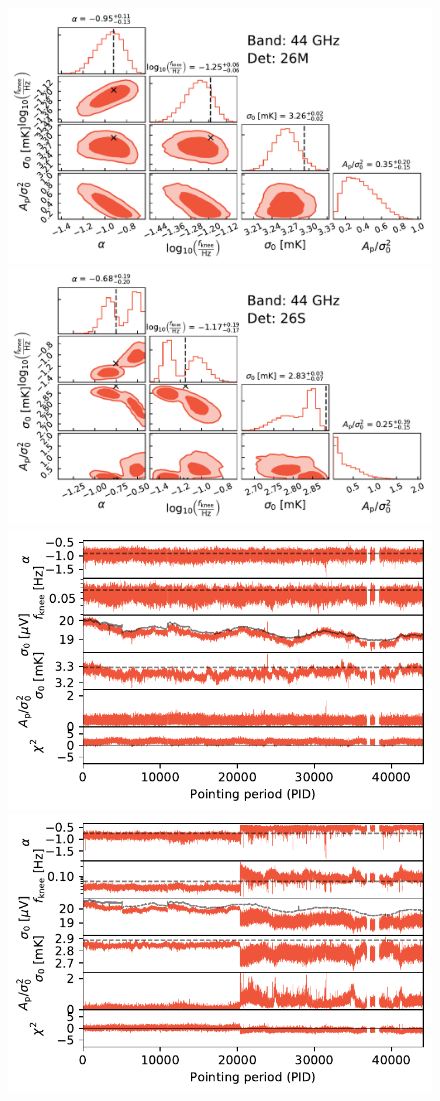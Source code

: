 \documentclass{aa}
\begin{document}
\begin{figure}[t]
        \begin{center}
                \includegraphics[width=0.495\linewidth]{figs/corner_band_044_det_5_mean_new.pdf}
                \includegraphics[width=0.495\linewidth]{figs/corner_band_044_det_6_mean_new.pdf}\\
                \includegraphics[width=0.495\linewidth]{figs/xi_vs_pid_band_044_det_5_mean_new.pdf}
                \includegraphics[width=0.495\linewidth]{figs/xi_vs_pid_band_044_det_6_mean_new.pdf}\\    
                \vspace*{-4.5mm} 
        \end{center}
        

\end{figure}
\end{document}
